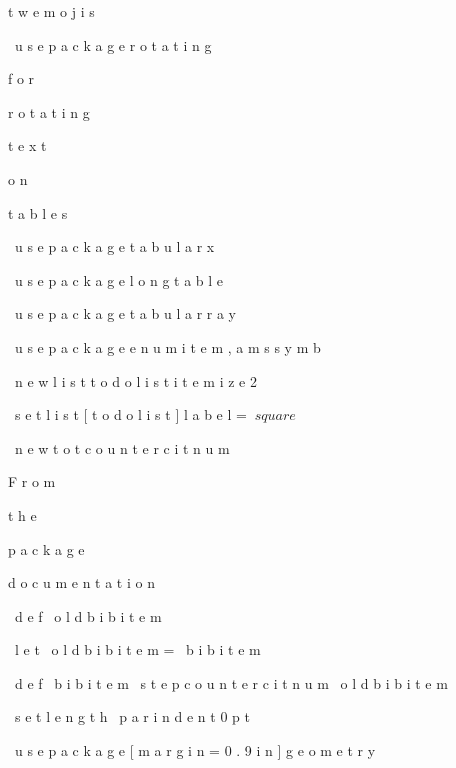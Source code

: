t
w
e
m
o
j
i
s

\
u
s
e
p
a
c
k
a
g
e
{
r
o
t
a
t
i
n
g
}
 
%
 
f
o
r
 
r
o
t
a
t
i
n
g
 
t
e
x
t
 
o
n
 
t
a
b
l
e
s

\
u
s
e
p
a
c
k
a
g
e
{
t
a
b
u
l
a
r
x
}

\
u
s
e
p
a
c
k
a
g
e
{
l
o
n
g
t
a
b
l
e
}

\
u
s
e
p
a
c
k
a
g
e
{
t
a
b
u
l
a
r
r
a
y
}

\
u
s
e
p
a
c
k
a
g
e
{
e
n
u
m
i
t
e
m
,
a
m
s
s
y
m
b
}

\
n
e
w
l
i
s
t
{
t
o
d
o
l
i
s
t
}
{
i
t
e
m
i
z
e
}
{
2
}

\
s
e
t
l
i
s
t
[
t
o
d
o
l
i
s
t
]
{
l
a
b
e
l
=
$
\
s
q
u
a
r
e
$
}

\
n
e
w
t
o
t
c
o
u
n
t
e
r
{
c
i
t
n
u
m
}
 
%
F
r
o
m
 
t
h
e
 
p
a
c
k
a
g
e
 
d
o
c
u
m
e
n
t
a
t
i
o
n

\
d
e
f
\
o
l
d
b
i
b
i
t
e
m
{
}
 
\
l
e
t
\
o
l
d
b
i
b
i
t
e
m
=
\
b
i
b
i
t
e
m

\
d
e
f
\
b
i
b
i
t
e
m
{
\
s
t
e
p
c
o
u
n
t
e
r
{
c
i
t
n
u
m
}
\
o
l
d
b
i
b
i
t
e
m
}

\
s
e
t
l
e
n
g
t
h
{
\
p
a
r
i
n
d
e
n
t
}
{
0
p
t
}

\
u
s
e
p
a
c
k
a
g
e
[
m
a
r
g
i
n
=
0
.
9
i
n
]
{
g
e
o
m
e
t
r
y
}


 
 
 
 
